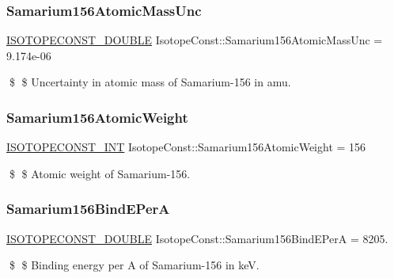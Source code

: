 \subsubsection{\texorpdfstring{Samarium156\+Atomic\+Mass\+Unc}{Samarium156AtomicMassUnc}}
{\footnotesize\ttfamily \mbox{\hyperlink{group___isotope_const-_macros_ga8f45a7272ce02c0b4c65c44636ed719a}{I\+S\+O\+T\+O\+P\+E\+C\+O\+N\+S\+T\+\_\+\+D\+O\+U\+B\+LE}} Isotope\+Const\+::\+Samarium156\+Atomic\+Mass\+Unc = 9.\+174e-\/06}

\$ \$ Uncertainty in atomic mass of Samarium-\/156 in amu. \mbox{\label{group___isotope_const-_samarium-_sm156_ga34cd65a7827e1786177dbe08d3cddd87}} 
\subsubsection{\texorpdfstring{Samarium156\+Atomic\+Weight}{Samarium156AtomicWeight}}
{\footnotesize\ttfamily \mbox{\hyperlink{group___isotope_const-_macros_ga5f18360b3e99483a35c32d789e62621c}{I\+S\+O\+T\+O\+P\+E\+C\+O\+N\+S\+T\+\_\+\+I\+NT}} Isotope\+Const\+::\+Samarium156\+Atomic\+Weight = 156}

\$ \$ Atomic weight of Samarium-\/156. \mbox{\label{group___isotope_const-_samarium-_sm156_ga23eaf315aa8e338bd1d4f89cf1632406}} 
\subsubsection{\texorpdfstring{Samarium156\+Bind\+E\+PerA}{Samarium156BindEPerA}}
{\footnotesize\ttfamily \mbox{\hyperlink{group___isotope_const-_macros_ga8f45a7272ce02c0b4c65c44636ed719a}{I\+S\+O\+T\+O\+P\+E\+C\+O\+N\+S\+T\+\_\+\+D\+O\+U\+B\+LE}} Isotope\+Const\+::\+Samarium156\+Bind\+E\+PerA = 8205.}

\$ \$ Binding energy per A of Samarium-\/156 in keV. \mbox{\label{group___isotope_const-_samarium-_sm156_ga7c4c98158d29a0b91506f632442d9bec}} 
